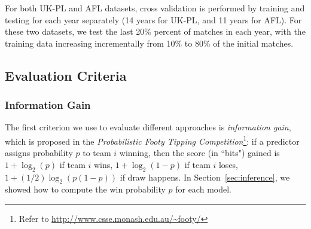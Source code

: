 \documentclass[runningheads,a4paper]{llncs}
\begin{document}


For both UK-PL and AFL datasets, cross validation is performed by
training and testing for each year separately (14 years for UK-PL, and
11 years for AFL).  For these two datasets, we test the last 20\%
percent of matches in each year, with the training data increasing
incrementally from 10\% to 80\% of the initial matches.

\subsection{Evaluation Criteria}


\subsubsection{Information Gain}
\label{sec:informationGain}

The first criterion we use to evaluate different approaches is
\emph{information gain}, which is proposed in the \emph{Probabilistic Footy
Tipping Competition}\footnote{Refer to
\url{http://www.csse.monash.edu.au/~footy/}}: if a predictor assigns
probability $p$ to team $i$ winning, then the score (in ``bits")
gained is $1+\log_2(p)$ if team $i$ wins, $1+\log_2(1-p)$ if team $i$ loses, $1+(1/2)\log_2(p(1-p))$ if draw happens.
In Section~\ref{sec:inference}, we showed how to compute the win
probability $p$ for each model.
\end{document}
